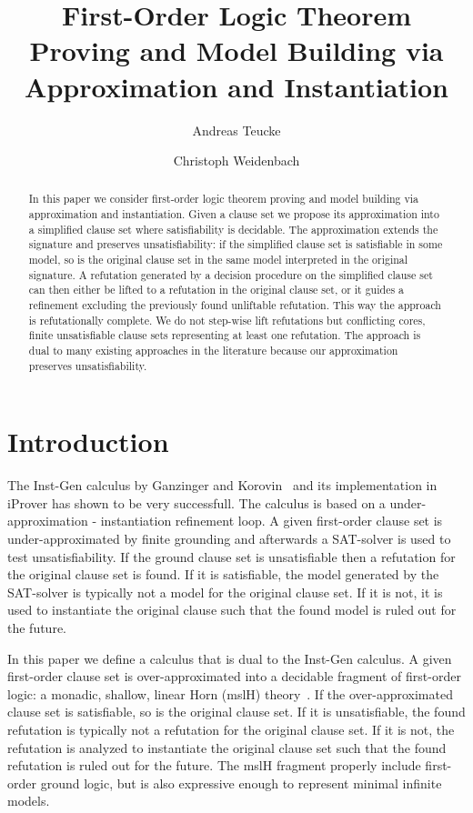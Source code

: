 \documentclass{llncs}
\title{First-Order Logic Theorem Proving and Model Building via Approximation and Instantiation}
\author{Andreas Teucke\inst{1,2} \and Christoph Weidenbach\inst{1}}
\institute{Max-Planck Institut for Informatics, Campus E1 4
66123 Saarbr\"ucken
Germany \and Graduate School of Computer Science, Saarbr\"ucken, Germany
}
\date{}
\begin{document}
\pagestyle{plain}
\maketitle

\begin{abstract}
In this paper we consider first-order logic theorem proving and model
building via approximation and instantiation. 
Given a clause set we propose its approximation into a simplified clause set where
satisfiability is decidable. The approximation extends the signature
and  preserves unsatisfiability: if the simplified clause set is satisfiable in some model, 
so is the original clause set in the same model interpreted in the original signature. 
A refutation generated by a decision procedure on the simplified clause set can 
then either be lifted to a refutation in 
the original clause set, or it guides 
a refinement excluding the previously found unliftable refutation. 
This way the approach is refutationally complete. We do not step-wise lift refutations
but conflicting cores, finite unsatisfiable clause sets representing at least one refutation.
The approach is dual to many
existing approaches in the literature because our approximation preserves unsatisfiability.
\end{abstract}


\section{Introduction} \label{sec:intro}

The Inst-Gen calculus by Ganzinger and Korovin~\cite{DBLP:conf/birthday/Korovin13} and its
implementation in iProver has shown to be very successfull. The calculus is based on a
under-approximation - instantiation refinement loop. A given first-order clause set is under-approximated
by finite grounding and afterwards a SAT-solver is used to test unsatisfiability. If the
ground clause set is unsatisfiable then a refutation for the original clause set is found.
If it is satisfiable, the model generated by the SAT-solver is typically not a model for
the original clause set. If it is not, it is used to instantiate the
original clause such that the found model is ruled out for the future.

In this paper we define a calculus that is dual to the Inst-Gen calculus.
A given first-order clause set is over-approximated into a decidable fragment
of first-order logic: a monadic, shallow, linear Horn (mslH) theory~\cite{Weidenbach99cade}.
If the over-approximated clause set is satisfiable, so is the original clause set.
If it is unsatisfiable, the found refutation is typically not a refutation for
the original clause set. If it is not, the refutation is analyzed to instantiate
the original clause set such that the found refutation is ruled out for the future.
The mslH fragment properly include first-order ground logic, but is also expressive
enough to represent minimal infinite models.
\end{document}
